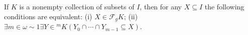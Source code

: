If $K$ is a nonempty collection of subsets of $I$, then for any $X \subseteq I$ the following conditions are equivalent:
(i) $X \in \mathcal{F}_gK$;
(ii) $\exists m \in \omega \sim 1 \exists Y \in {}^mK(Y_0 \cap \cdots \cap Y_{m-1} \subseteq X)$.
